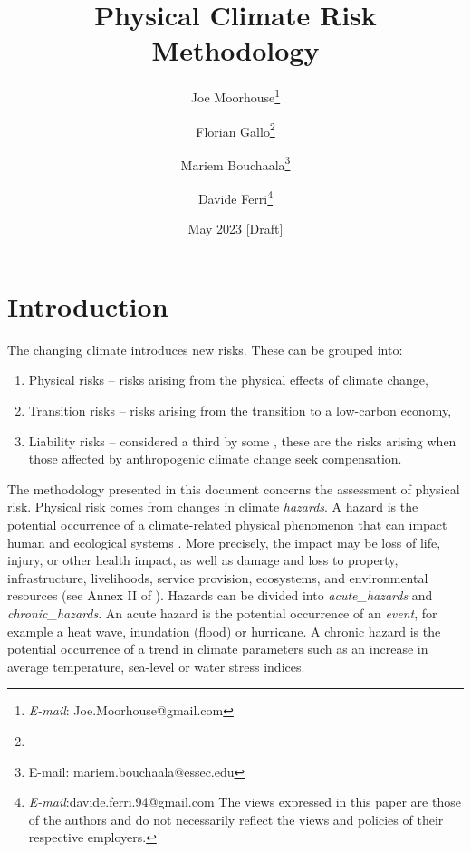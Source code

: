 \documentclass[a4paper,11pt]{extarticle} %
\title{Physical Climate Risk Methodology}
\author{Joe Moorhouse\thanks{\textit{E-mail}: Joe.Moorhouse@gmail.com}
        \and
        Florian Gallo\thanks{}
        \and
        Mariem Bouchaala\thanks{{E-mail}: mariem.bouchaala@essec.edu}
        \and
        Davide Ferri\thanks{\textit{E-mail}:davide.ferri.94@gmail.com
        \smallskip
        \newline%
    The views expressed in this paper are those of the authors and do not necessarily reflect the views and policies of their respective employers.}
    }
\date{May 2023 [Draft]}
\begin{document}

\maketitle{}



\clearpage
\setcounter{tocdepth}{4}
\renewcommand{\contentsname}{Contents}
\tableofcontents




\clearpage
\section{Introduction}
\label{Sec:Introduction}

The changing climate introduces new risks. These can be grouped into:
\begin{enumerate}
	\item Physical risks -- risks arising from the physical effects of climate change,
	\item Transition risks -- risks arising from the transition to a low-carbon economy,
	\item Liability risks -- considered a third by some \cite{WoetzelEtAl:2020}, these are the risks arising when those affected by anthropogenic climate change seek compensation. 
\end{enumerate}


The methodology presented in this document concerns the assessment of physical risk. Physical risk comes from changes in climate \emph{\gls{hazard}s}. A hazard is the potential occurrence of a climate-related physical phenomenon that can impact human and ecological systems \cite{ReisingerEtAl:2020}\cite{WoetzelEtAl:2020}\cite{MitchellEtAl:2017}. More precisely, the impact may be loss of life, injury, or other
health impact, as well as damage and loss to property, infrastructure,
livelihoods, service provision, ecosystems, and environmental resources (see Annex II of \cite{PortnerEtAl:2022}). Hazards can be divided into \emph{\gls{acute_hazard}s} and \emph{\gls{chronic_hazard}s}. An acute hazard is the potential occurrence of an \emph{event}, for example a heat wave, inundation (flood) or hurricane. A chronic hazard is the potential occurrence of a trend in climate parameters such as an increase in average temperature, sea-level or water stress indices.  
\end{document}
